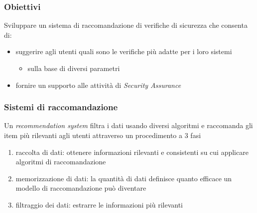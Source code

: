 \begin{frame}
    \frametitle{Obiettivi}
    Sviluppare un \alert{sistema di raccomandazione} di \alert{verifiche di sicurezza} che consenta di:
    \begin{itemize}
        \item suggerire agli utenti quali sono le verifiche \alert{più adatte} per i loro sistemi
        \vspace{-0.4 cm}
        \begin{itemize}
            \item sulla base di diversi parametri
        \end{itemize}
        \item fornire un \alert{supporto} alle \alert{attività di \textit{Security Assurance}}
    \end{itemize}
\end{frame}

\begin{frame}
    \frametitle{Sistemi di raccomandazione}
    Un \textit{recommendation system} filtra i dati usando diversi algoritmi e raccomanda gli item più rilevanti agli utenti attraverso 
    un procedimento a 3 fasi
    \begin{enumerate}
        \item \alert{raccolta di dati}: ottenere informazioni rilevanti e consistenti su cui applicare algoritmi di raccomandazione
        \item \alert{memorizzazione di dati}: la quantità di dati definisce quanto efficace un modello di raccomandazione può diventare
        \item \alert{filtraggio dei dati}: estrarre le informazioni più rilevanti
    \end{enumerate}
\end{frame}

